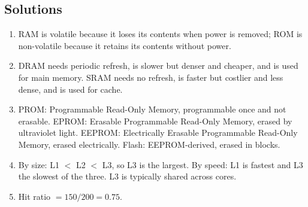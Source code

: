 \documentclass[11pt]{article}
\begin{document}
\subsection*{Solutions}
\begingroup\small
\begin{enumerate}[label=\arabic*.]
  \item RAM is volatile because it loses its contents when power is
    removed; ROM is non-volatile because it retains its contents without
    power.
  \item DRAM needs periodic refresh, is slower but denser and cheaper, and
    is used for main memory. SRAM needs no refresh, is faster but costlier
    and less dense, and is used for cache.
  \item PROM: Programmable Read-Only Memory, programmable once and not
    erasable. EPROM: Erasable Programmable Read-Only Memory, erased by
    ultraviolet light. EEPROM: Electrically Erasable Programmable Read-Only
    Memory, erased electrically. Flash: EEPROM-derived, erased in blocks.
  \item By size: L1 $<$ L2 $<$ L3, so L3 is the largest. By speed: L1 is
    fastest and L3 the slowest of the three. L3 is typically shared across
    cores.
  \item Hit ratio $= 150/200 = 0.75$.
\end{enumerate}
\endgroup
\end{document}
